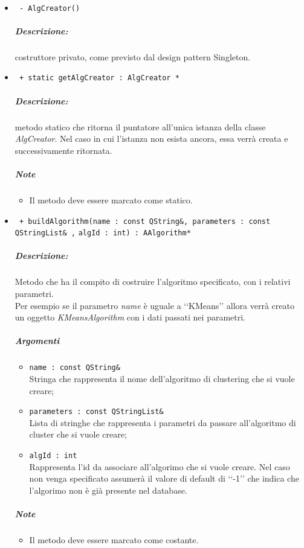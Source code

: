 \paragraph{\color{black}{Metodi}}
	\begin{itemize}
		\item \color{blue}\verb! - AlgCreator()!
		\color{black}
		\subparagraph{Descrizione:} costruttore privato, come previsto dal design pattern\g{} Singleton.
		
		\item \color{blue}\verb! + static getAlgCreator : AlgCreator *!
		\color{black}
		\subparagraph{Descrizione:} metodo statico che  ritorna il puntatore all'unica istanza della classe \textsl{AlgCreator}. Nel caso in cui l'istanza non esista ancora, essa verrà creata e successivamente ritornata.
		\subparagraph{Note}
			\begin{itemize}
				\item Il metodo deve essere marcato come statico.
			\end{itemize}
			
		\item \color{blue}\verb! + buildAlgorithm(name : const QString&, parameters : const QStringList& ,!
					\verb!algId : int) : AAlgorithm*!
		\color{black}
		\subparagraph{Descrizione:}Metodo che ha il compito di costruire l'algoritmo specificato, con i relativi parametri.\\
		Per esempio se il parametro \textit{name} è uguale a \lq\lq{}KMeans\rq\rq{} allora verrà creato un oggetto \textit{KMeansAlgorithm} con i dati passati nei parametri.
		\subparagraph{Argomenti}
			\begin{itemize}
				\item \color{RoyalPurple}\verb!name : const QString&!\\
				\color{black}Stringa che rappresenta il nome dell'algoritmo di clustering\g{} che si vuole creare;
				
				\item \color{RoyalPurple}\verb!parameters : const QStringList&!\\
				\color{black}Lista di stringhe che rappresenta i parametri da passare all'algoritmo di cluster\g{} che si vuole creare;
				
				\item \color{RoyalPurple}\verb!algId : int!\\
				\color{black}Rappresenta l'id da associare all'algorimo che si vuole creare. Nel caso non venga specificato assumerà il valore di default di \lq\lq{}-1\rq\rq{} che indica che l'algorimo non è già presente nel database.
			\end{itemize}
		\subparagraph{Note}
			\begin{itemize}
				\item Il metodo deve essere marcato come costante.
			\end{itemize}
	

\end{itemize}
